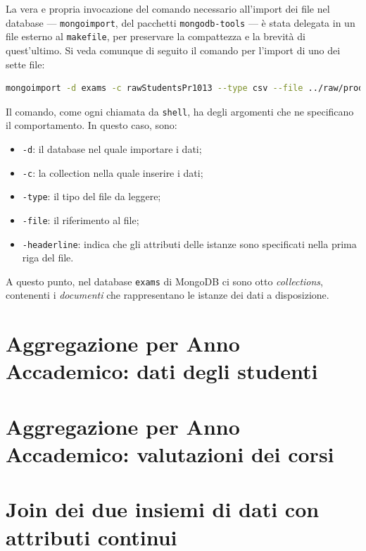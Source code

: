 	La vera e propria invocazione del comando necessario all'import dei file nel database --- \texttt{mongoimport}, del pacchetti \texttt{mongodb-tools} --- è stata delegata in un file esterno al \texttt{makefile}, per preservare la compattezza e la brevità di quest'ultimo. Si veda comunque di seguito il comando per l'import di uno dei sette file: 

	\begin{lstlisting}[language=bash,caption={dettaglio dell'importazione dei dati in MongoDB}]
		mongoimport -d exams -c rawStudentsPr1013 --type csv --file ../raw/prod_stud_10-11-12-13.csv --headerline
	\end{lstlisting}

	Il comando, come ogni chiamata da \texttt{shell}, ha degli argomenti che ne specificano il comportamento. In questo caso, sono:

	\begin{itemize}
		\item \texttt{-d}: il database nel quale importare i dati;
		\item \texttt{-c}: la collection nella quale inserire i dati;
		\item \texttt{-type}: il tipo del file da leggere;
		\item \texttt{-file}: il riferimento al file;
		\item \texttt{-headerline}: indica che gli attributi delle istanze sono specificati nella prima riga del file.
	\end{itemize}

	A questo punto, nel database \texttt{exams} di MongoDB ci sono otto \textit{collections}, contenenti i \textit{documenti} che rappresentano le istanze dei dati a disposizione.

\section{Aggregazione per Anno Accademico: dati degli studenti}

\section{Aggregazione per Anno Accademico: valutazioni dei corsi}

\section{Join dei due insiemi di dati con attributi continui}

